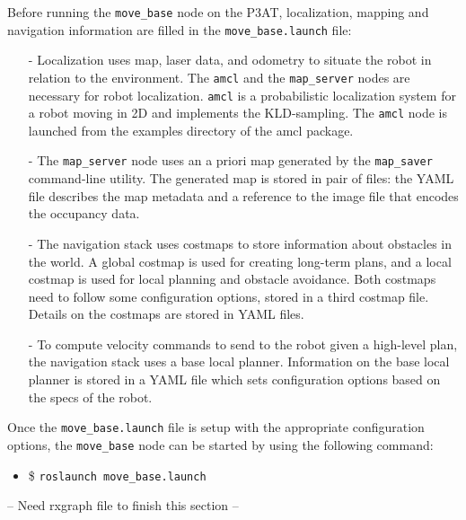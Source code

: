 Before running the \texttt{move\_base} node on the P3AT, localization, mapping and navigation information are filled in the \texttt{move\_base.launch} file:
\begin{itemize}
 \item [-] Localization uses map, laser data, and odometry to situate the robot in relation to the environment. The \texttt{amcl} and the \texttt{map\_server} nodes are necessary for robot localization. \texttt{amcl} is a probabilistic localization system for a robot moving in 2D and implements the KLD-sampling\cite{DIETER.IJRS.2003}. 
The \texttt{amcl} node is launched from the examples directory of the amcl package.
\item [-] The \texttt{map\_server} node uses an a priori map generated by the \texttt{map\_saver} command-line utility. The generated map is stored in pair of files: the YAML file describes the map metadata and a reference to the image file that encodes the occupancy data. 
\item [-] The navigation stack uses costmaps to store information about obstacles in the world. A global costmap is used for creating long-term plans, and a local costmap is used for local planning and obstacle avoidance. Both costmaps need to follow some configuration options, stored in a third costmap file. Details on the costmaps are stored in YAML files.
\item [-] To compute velocity commands to send to the robot given a high-level plan, the navigation stack uses a base local planner. Information on the base local planner is stored in a YAML file which sets configuration options based on the specs of the robot. 
\end{itemize}

Once the \texttt{move\_base.launch} file is setup with the appropriate configuration options, the \texttt{move\_base} node can be started by using the following command:
\begin{itemize}
 \item [] \item \$ \texttt{roslaunch move\_base.launch}
\end{itemize}

-- Need rxgraph file to finish this section --